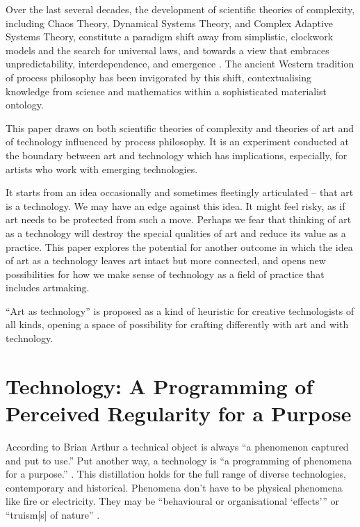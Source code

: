 \documentclass[letter:wpaper]{article}
\begin{document}
    Over the last several decades, the development of scientific theories of complexity, including Chaos Theory, Dynamical Systems Theory, and Complex Adaptive Systems Theory, constitute a paradigm shift away from simplistic, clockwork models and the search for universal laws, and towards a view that embraces unpredictability, interdependence, and emergence \citep{StengersOrdrOtOfChs1984}. The ancient Western tradition of process philosophy \citep{SeibtStnfrdEncyclpdPrcssPhlsphy1974} has been invigorated by this shift, contextualising knowledge from science and mathematics within a sophisticated materialist ontology.
    
    This paper draws on both scientific theories of complexity and theories of art and of technology influenced by process philosophy. It is an experiment conducted at the boundary between art and technology which has implications, especially, for artists who work with emerging technologies.
    
    It starts from an idea occasionally \citep[pp.74–75]{SauvagnarguesArtmchns2016} \citep{GellThTchnlgyOfEnchntmnt1992} and sometimes fleetingly \citep[p.202]{ZepkeOSullivanDlzCntmprryArt2010} articulated – that art is a technology. We may have an edge against this idea. It might feel risky, as if art needs to be protected from such a move. Perhaps we fear that thinking of art as a technology will destroy the special qualities of art and reduce its value as a practice. This paper explores the potential for another outcome in which the idea of art as a technology leaves art intact but more connected, and opens new possibilities for how we make sense of technology as a field of practice that includes artmaking. 
    
    “Art as technology” is proposed as a kind of heuristic for creative technologists of all kinds, opening a space of possibility for crafting differently with art and with technology.

\section{Technology: A Programming of Perceived Regularity for a Purpose} 

    According to Brian Arthur a technical object is always “a phenomenon captured and put to use.” \citep[p.53]{theNatureOfTechnology2009} Put another way, a technology is “a programming of phenomena for a purpose.” \citep[p.53]{theNatureOfTechnology2009}. This distillation holds for the full range of diverse technologies, contemporary and historical. Phenomena don't have to be physical phenomena like fire or electricity. They may be “behavioural or organisational ‘effects’” \citep[p.55]{theNatureOfTechnology2009} or “truism[s] of nature” \citep[p.45]{theNatureOfTechnology2009}.
\end{document}
